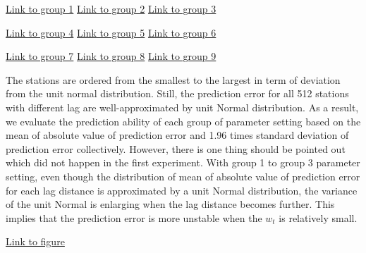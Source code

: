 \begin{framed}
\begin{center}
  \href{../plots/a1950/E2/QQ.error.tmax.group.1.pdf}{Link to group 1} 
  \;\;\;\;\;\;\;\;\;\;
  \href{../plots/a1950/E2/QQ.error.tmax.group.2.pdf}{Link to group 2} 
  \;\;\;\;\;\;\;\;\;\;
  \href{../plots/a1950/E2/QQ.error.tmax.group.3.pdf}{Link to group 3}
\end{center}
\begin{center}
  \href{../plots/a1950/E2/QQ.error.tmax.group.4.pdf}{Link to group 4} 
  \;\;\;\;\;\;\;\;\;\;
  \href{../plots/a1950/E2/QQ.error.tmax.group.5.pdf}{Link to group 5} 
  \;\;\;\;\;\;\;\;\;\;
  \href{../plots/a1950/E2/QQ.error.tmax.group.6.pdf}{Link to group 6}
\end{center}
\begin{center}
  \href{../plots/a1950/E2/QQ.error.tmax.group.7.pdf}{Link to group 7} 
  \;\;\;\;\;\;\;\;\;\;
  \href{../plots/a1950/E2/QQ.error.tmax.group.8.pdf}{Link to group 8} 
  \;\;\;\;\;\;\;\;\;\;
  \href{../plots/a1950/E2/QQ.error.tmax.group.9.pdf}{Link to group 9}
  \label{QQ.error.laggroup}
\end{center}
\end{framed}
The stations are ordered from the smallest to the largest in term of deviation
from the unit normal distribution. Still, the prediction error for all 512 
stations with different lag are well-approximated by unit Normal distribution.
As a result, we evaluate the prediction ability of each group of parameter setting
based on the mean of absolute value of prediction error and 1.96 times standard 
deviation of prediction error collectively. However, there is one thing should be 
pointed out which did not happen in the first experiment.
With group 1 to group 3 parameter setting, even though the distribution of mean
of absolute value of prediction error for each lag distance is approximated by
a unit Normal distribution, the variance of the unit Normal is enlarging when 
the lag distance becomes further. This implies that the prediction error is more
unstable when the $w_t$ is relatively small.

\begin{framed}
\begin{center}
  \href{../plots/a1950/E2/tmax.absmeans.vs.lag.sw.pdf}{Link to figure}
  \label{e2.abserrorlag.sw}
\end{center}
\end{framed}

